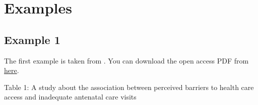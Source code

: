 \documentclass[
]{book}
\begin{document}
\hypertarget{examples}{%
\section{Examples}\label{examples}}

\hypertarget{example-1}{%
\subsection{Example 1}\label{example-1}}

The first example is taken from \citet{nisingizwe2020perceived}. You can download the open access PDF from \href{https://bmcpregnancychildbirth.biomedcentral.com/track/pdf/10.1186/s12884-020-2775-8.pdf}{here}.

Table 1: A study about the association between perceived barriers to health care access and inadequate antenatal care visits \citep{nisingizwe2020perceived}
\end{document}
